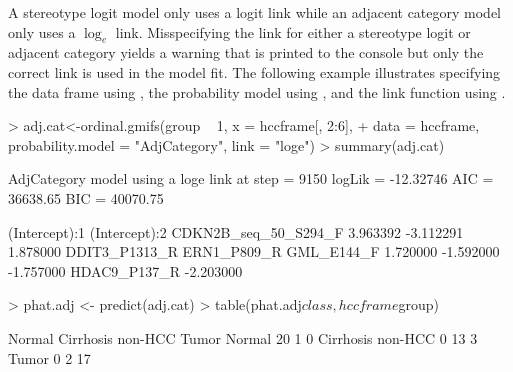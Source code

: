 \documentclass[article, shortclass, nojss]{jss}
\begin{document}
A stereotype logit model only uses a logit link while an adjacent category model only uses a $\log_e$ link. Misspecifying the link for either a stereotype logit or adjacent category yields a warning that is printed to the  console but only the correct link is used in the model fit. The following example illustrates specifying the data frame using , the probability model using , and the link function using .
\begin{Schunk}
\begin{Sinput}
> adj.cat<-ordinal.gmifs(group ~ 1, x = hccframe[, 2:6], 
+ 	data = hccframe, probability.model = "AdjCategory", link = "loge")
> summary(adj.cat)
\end{Sinput}
\begin{Soutput}
AdjCategory model using a loge link 
at step    =  9150 
logLik     =  -12.32746 
AIC        =  36638.65 
BIC        =  40070.75 

       (Intercept):1        (Intercept):2 CDKN2B_seq_50_S294_F 
            3.963392            -3.112291             1.878000 
       DDIT3_P1313_R          ERN1_P809_R           GML_E144_F 
            1.720000            -1.592000            -1.757000 
        HDAC9_P137_R 
           -2.203000 
\end{Soutput}
\begin{Sinput}
> phat.adj <- predict(adj.cat)
> table(phat.adj$class, hccframe$group)
\end{Sinput}
\begin{Soutput}
                    Normal Cirrhosis non-HCC Tumor
  Normal                20                 1     0
  Cirrhosis non-HCC      0                13     3
  Tumor                  0                 2    17
\end{Soutput}
\end{Schunk}
\end{document}
